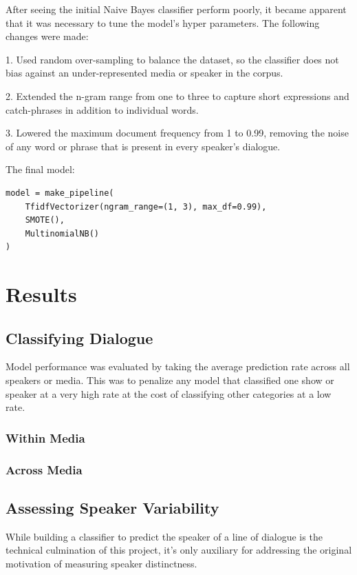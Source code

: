 \documentclass{article}
\begin{document}
\begin{titlepage}
After seeing the initial Naive Bayes classifier perform poorly, it became apparent that it was necessary to tune the model's hyper parameters. The following changes were made:

1. Used random over-sampling to balance the dataset, so the classifier does not bias against an under-represented media or speaker in the corpus.

2. Extended the n-gram range from one to three to capture short expressions and catch-phrases in addition to individual words.

3. Lowered the maximum document frequency from 1 to 0.99, removing the noise of any word or phrase that is present in every speaker's dialogue.

The final model:

\begin{verbatim}
model = make_pipeline(
    TfidfVectorizer(ngram_range=(1, 3), max_df=0.99),
    SMOTE(),
    MultinomialNB()
)
\end{verbatim}

\section{Results}

\subsection{Classifying Dialogue}

Model performance was evaluated by taking the average prediction rate across all speakers or media. This was to penalize any model that classified one show or speaker at a very high rate at the cost of classifying other categories at a low rate.

\subsubsection{Within Media}
\subsubsection{Across Media}

\subsection{Assessing Speaker Variability}
While building a classifier to predict the speaker of a line of dialogue is the technical culmination of this project, it's only auxiliary for addressing the original motivation of measuring speaker distinctness.


\end{titlepage}
\end{document}
